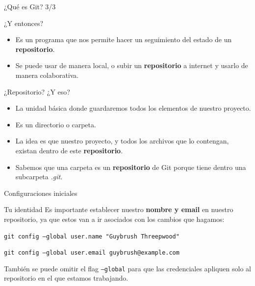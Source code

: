 \begin{frame}{¿Qué es Git? 3/3}
\begin{center}
    \begin{block} {¿Y entonces?}
        \begin{itemize}
            \item Es un programa que nos permite hacer un seguimiento del estado de un \textbf{repositorio}.
            \pause
            \item Se puede usar de manera local, o subir un \textbf{repositorio} a internet y usarlo de manera colaborativa. 
        \end{itemize}
    \end{block}
\end{center}
\pause
    \begin{block}{¿Repositorio? ¿Y eso?}
    \begin{itemize}
        \pause
        \item La unidad básica donde guardaremos todos los elementos de nuestro proyecto.
        \pause
        \item Es un directorio o carpeta.
        \pause
        \item La idea es que nuestro proyecto, y todos los archivos que lo contengan, existan dentro de este \textbf{repositorio}.
        \pause
        \item Sabemos que una carpeta es un \textbf{repositorio} de Git porque tiene dentro una subcarpeta \textit{.git}.
    \end{itemize}

    \end{block}
    
\end{frame}

\begin{frame}[fragile]{Configuraciones iniciales}

    \begin{block}{Tu identidad}
        Es importante establecer nuestro \textbf{nombre y email} en nuestro repositorio, ya que estos van a ir asociados con los cambios que hagamos:

        \vspace{0.5em}

        \texttt{git config --global user.name "Guybrush Threepwood"}

        \texttt{git config --global user.email guybrush@example.com}


    También se puede omitir el flag \texttt{--global} para que las credenciales apliquen solo al repositorio en el que estamos trabajando.
        \end{block}
\end{frame}

